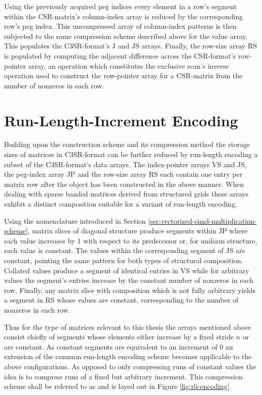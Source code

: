     Using the previously acquired peg indices every element in a row's segment within the CSR-matrix's column-index
    array is reduced by the corresponding row's peg index. This uncompressed array of column-index patterns is then
    subjected to the same compression scheme described above for the value array. This populates the C3SR-format's J and
    JS arrays. Finally, the row-size array RS is populated by computing the adjacent difference across the CSR-format's
    row-pointer array, an operation which constitutes the exclusive scan's inverse operation used to construct the
    row-pointer array for a CSR-matrix from the number of nonzeros in each row.

  \section{Run-Length-Increment Encoding}

    Building upon the construction scheme and its compression method the storage sizes of matrices in C3SR-format can be
    further reduced by run-length encoding a subset of the C3SR-format's data arrays. The index-pointer arrays VS and
    JS, the peg-index array JP and the row-size array RS each contain one entry per matrix row after the object has been
    constructed in the above manner. When dealing with sparse banded matrices derived from structured grids these arrays
    exhibit a distinct composition suitable for a variant of run-length encoding.

    Using the nomenclature introduced in Section \ref{sec:vectorized-simd-multiplication-scheme}, matrix slices of
    diagonal structure produce segments within JP where each value increases by $1$ with respect to its predecessor or,
    for uniform structure, each value is constant. The values within the corresponding segment of JS are constant,
    pointing the same pattern for both types of structural composition. Collated values produce a segment of identical
    entries in VS while for arbitrary values the segment's entries increase by the constant number of nonzeros in each
    row. Finally, any matrix slice with composition which is not fully arbitrary yields a segment in RS whose values are
    constant, corresponding to the number of nonzeros in each row.

    Thus for the type of matrices relevant to this thesis the arrays mentioned above consist chiefly of segments whose
    elements either increase by a fixed stride $n$ or are constant. As constant segments are equivalent to an increment
    of $0$ an extension of the common run-length encoding scheme becomes applicable to the above configurations. As opposed to
    only compressing runs of constant values the idea is to compress runs of a fixed but arbitrary increment. This
    compression scheme shall be referred to as  and is layed out in Figure
    \ref{fig:rli-encoding}.

